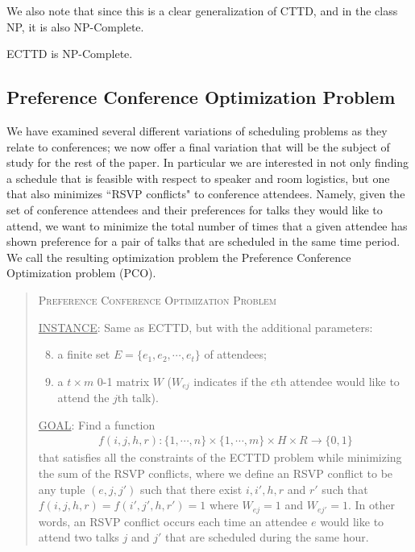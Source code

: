 \documentclass{svjour3}                     %
\begin{document}
We also note that since this is a clear generalization of CTTD, and in the class NP, it is also NP-Complete.
\begin{proposition}
	ECTTD is NP-Complete.
\end{proposition}

\subsection{Preference Conference Optimization Problem}
We have examined several different variations of scheduling problems as they relate to conferences; we now offer a final variation that will be the subject of study for the rest of the paper. 
In particular we are interested in not only finding a schedule that is feasible with respect to speaker and room logistics,  but one that also minimizes ``RSVP conflicts" to conference attendees. 
Namely, given the set of conference attendees and their preferences for talks they would like to attend, we want to minimize the total number of times that a given attendee has shown preference for a pair of talks that are scheduled in the same time period.
We call the resulting optimization problem the Preference Conference Optimization problem (PCO).
\begin{quote}
	\textsc{Preference Conference Optimization Problem}
	
	\underline{INSTANCE}: Same as ECTTD, but with the additional parameters:
	\begin{enumerate}[1.]
		\setcounter{enumi}{7}
		\item a finite set $E = \{e_1, e_2, \cdots, e_t\}$ of attendees;
		\item a $t \times m$ 0-1 matrix $W$ ($W_{ej}$ indicates if the $e$th attendee would like to attend the $j$th talk).
	\end{enumerate}
	
	\underline{GOAL}: Find a function 
	\begin{gather*}
		f(i,j,h,r) : \{1,\cdots,n\} \times \{1,\cdots,m\} \times H \times R \rightarrow \{0,1\}
	\end{gather*}
	that satisfies all the constraints of the ECTTD problem while minimizing the sum of the RSVP conflicts, where we define an RSVP conflict to be any tuple $(e,j,j')$ such that  there exist $i,i',h,r$ and $r'$ such that $f(i,j,h,r)=f(i',j',h,r')=1$ where $W_{ej}=1$ and $W_{ej'}=1$.
In other words, an RSVP conflict occurs each time an attendee $e$ would like to attend two talks $j$ and $j'$ that are scheduled during the same hour.
\end{quote}
\end{document}
